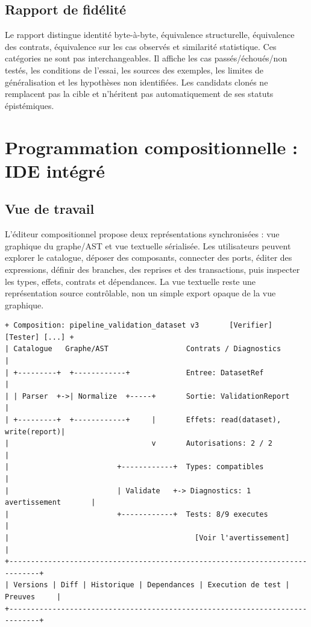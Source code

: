 \documentclass[11pt,a4paper]{article}
\begin{document}
\subsection{Rapport de fidélité}
Le rapport distingue identité byte-à-byte, équivalence structurelle, équivalence des contrats, équivalence sur les cas observés et similarité statistique. Ces catégories ne sont pas interchangeables. Il affiche les cas passés/échoués/non testés, les conditions de l'essai, les sources des exemples, les limites de généralisation et les hypothèses non identifiées. Les candidats clonés ne remplacent pas la cible et n'héritent pas automatiquement de ses statuts épistémiques.

\section{Programmation compositionnelle : IDE intégré}
\subsection{Vue de travail}
L'éditeur compositionnel propose deux représentations synchronisées : vue graphique du graphe/AST et vue textuelle sérialisée. Les utilisateurs peuvent explorer le catalogue, déposer des composants, connecter des ports, éditer des expressions, définir des branches, des reprises et des transactions, puis inspecter les types, effets, contrats et dépendances. La vue textuelle reste une représentation source contrôlable, non un simple export opaque de la vue graphique.

\begin{lstlisting}
+ Composition: pipeline_validation_dataset v3       [Verifier] [Tester] [...] +
| Catalogue   Graphe/AST                  Contrats / Diagnostics               |
| +---------+  +------------+             Entree: DatasetRef                  |
| | Parser  +->| Normalize  +-----+       Sortie: ValidationReport            |
| +---------+  +------------+     |       Effets: read(dataset), write(report)|
|                                 v       Autorisations: 2 / 2                 |
|                         +------------+  Types: compatibles                   |
|                         | Validate   +-> Diagnostics: 1 avertissement       |
|                         +------------+  Tests: 8/9 executes                 |
|                                           [Voir l'avertissement]             |
+-----------------------------------------------------------------------------+
| Versions | Diff | Historique | Dependances | Execution de test | Preuves     |
+-----------------------------------------------------------------------------+
\end{lstlisting}
\end{document}
